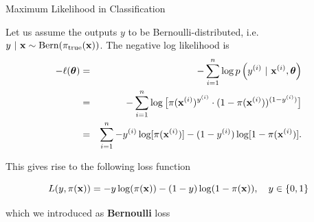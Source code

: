 \documentclass[11pt,compress,t,notes=noshow, xcolor=table]{beamer}
\begin{document}
\begin{vbframe}{Maximum Likelihood in Classification}

Let us assume the outputs $y$ to be Bernoulli-distributed, i.e. $y ~|~ \mathbf{x} \sim \text{Bern}(\pi_\text{true}(\mathbf{x}))$. 
The negative log likelihood is
\begin{eqnarray*}
- \ell(\bm{\theta}) &=& -\sum\limits_{i=1}^n \log p\left(y^{(i)} ~|~\mathbf{x}^{(i)}, \bm{\theta}\right) \\ 
&=& - \sum\limits_{i=1}^n \log \big[\pi(\mathbf{x}^{(i)})^{y^{(i)}} \cdot (1 - \pi(\mathbf{x}^{(i)}))^{(1 - y^{(i)})} \big]\\
&=& \sum\limits_{i=1}^n -y^{(i)} \log[\pi(\mathbf{x}^{(i)})] - (1-y^{(i)}) \log [1 - \pi(\mathbf{x}^{(i)})]. 
\end{eqnarray*}



This gives rise to the following loss function 

$$
  L(y, \pi(\mathbf{x})) = -y\log(\pi(\mathbf{x}))-(1-y)\log(1-\pi(\mathbf{x})), \quad y \in \{0, 1\}
$$

which we introduced as \textbf{Bernoulli} loss 













\end{vbframe}
\end{document}
